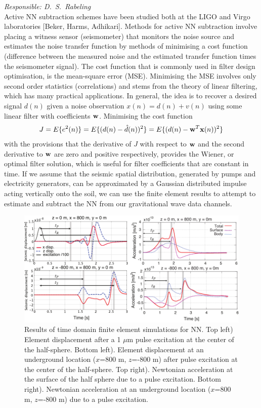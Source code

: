 \emph{
Responsible:  D.\ S.\ Rabeling  \\
}
Active NN subtraction schemes have been studied both at the LIGO and Virgo laboratories [Beker, Harms, Adhikari]. Methods for active NN subtraction involve placing a witness sensor (seismometer) that monitors the noise source and estimates the noise transfer function by methods of minimising a cost function (difference between the measured noise and the estimated transfer function times the seismometer signal). The cost function that is commonly used in filter design optimisation, is the mean-square error (MSE). Minimising the MSE involves only second order statistics (correlations) and stems from the theory of linear filtering, which has many practical applications. In general, the idea is to recover a desired signal $d(n)$ given a noise observation $x(n)=d(n)+v(n)$ using some linear filter with coefficients ${\bf w}$. Minimising the cost function 
\begin{eqnarray}
		J=  E\{e^{2}(n)\} = E\{ (d(n)-\hat{d}(n))^{2}\} = E\{ (d(n)- {\bf w}^{T}{\bf x}(n))^{2}\} 
\end{eqnarray}
with the provisions that the derivative of $J$ with respect to ${\bf w}$ and the second derivative to ${\bf w}$ are zero and positive respectively, provides the Wiener, or optimal filter solution, which is useful for filter coefficients that are constant in time. If we assume that the seismic spatial distribution, generated by pumps and electricity generators, can be approximated by a Gaussian distributed impulse acting vertically onto the soil, we can use the finite element results to attempt to estimate and subtract the NN from our gravitational wave data channels. 

\begin{figure}[h!]
	\begin{center}
		\includegraphics[width=16.5cm]{./Sec_SiteInfra/Figures/nngeneration.pdf}
		\caption{Results of time domain finite element simulations for NN. Top left) Element displacement after a 1 $\mu$m pulse excitation at the center of the half-sphere. Bottom left). Element displacement at an underground location ($x$=800 m, $z$=-800 m) after pulse excitation at the center of the half-sphere. Top right). Newtonian acceleration at the surface of the half sphere due to a pulse excitation. Bottom right). Newtonian acceleration at an underground location ($x$=800 m, $z$=-800 m) due to a pulse excitation.}
		\label{fig:NNfigure1}
	\end{center}
\end{figure}



